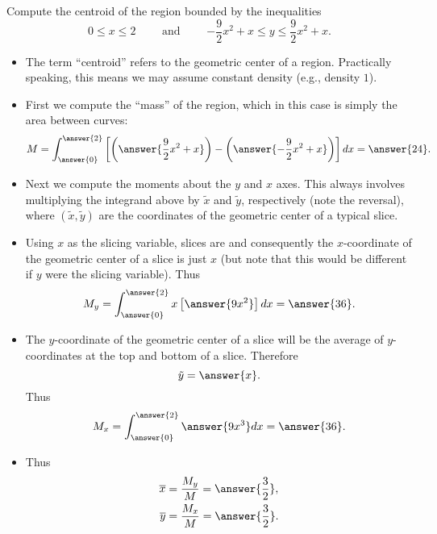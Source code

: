 \documentclass{ximera}
\begin{document}
\begin{example}%
Compute the centroid of the region bounded by the inequalities $$0 \leq x \leq 2 \qquad \mbox{ and } \qquad {-\frac{9}{2}x^2+x} \leq y \leq {\frac{9}{2}x^2+x}.$$
\begin{itemize}
\item The term ``centroid'' refers to the geometric center of a region. Practically speaking, this means we may assume constant density (e.g., density $1$).
\item First we compute the ``mass'' of the region, which in this case is simply the area between curves:
\[ M = \int_{\answer{0}}^{\answer{2}} \left[ \left(\answer{\frac{9}{2}x^2+x}\right) - \left(\answer{-\frac{9}{2}x^2+x}\right) \right] dx  = \answer{24}. \]
\item Next we compute the moments about the $y$ and $x$ axes. This always involves multiplying the integrand above by $\tilde x$ and $\tilde y$, respectively (note the reversal), where $(\tilde x,\tilde y)$ are the coordinates of the geometric center of a typical slice.
\item Using $x$ as the slicing variable, slices are  and consequently the $x$-coordinate of the geometric center of a slice is just $x$ (but note that this would be different if $y$ were the slicing variable).  Thus
\[ M_y= \int_{\answer{0}}^{\answer{2}} x \left[ \answer{9 x^2} \right] dx = \answer{36}. \]
\item The $y$-coordinate of the geometric center of a slice will be the average of $y$-coordinates at the top and bottom of a slice. Therefore
\[ \tilde y = \answer{x}. \]
Thus
\[ M_x = \int_{\answer{0}}^{\answer{2}}  \answer{9x^3}  dx = \answer{36}. \]
\item Thus
\[ \begin{aligned}
 \overline{x} &  = \frac{M_y}{M} = \answer{\frac{3}{2}}, \\
 \overline{y} &  = \frac{M_x}{M} = \answer{\frac{3}{2}}.
 \end{aligned} \]
 \end{itemize}
\end{example}
\end{document}
